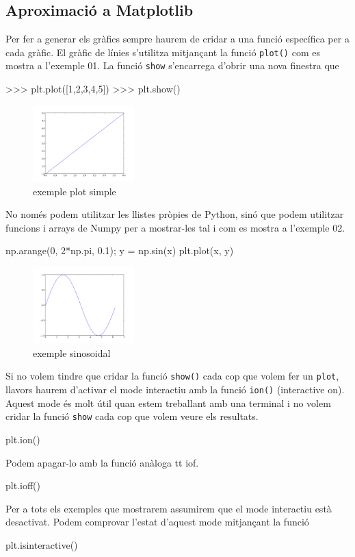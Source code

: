 \subsection{Aproximació a Matplotlib}
Per fer a generar els gràfics sempre haurem de cridar a una funció específica per a cada gràfic. El gràfic de línies s'utilitza mitjançant la funció {\tt plot()} com es mostra a l'exemple 01. La funció {\tt show} s'encarrega d'obrir una nova finestra que 
\begin{tip}[caption=Plot sencill]
>>> plt.plot([1,2,3,4,5])
>>> plt.show()
\end{tip}
\begin{figure}[!h]
    \begin{centering}
    \includegraphics[width=0.35\textwidth]{img/ex01.png}
    \caption{exemple plot simple}
    \label{fig:figex01}
    \end{centering}
\end{figure}
No només podem utilitzar les llistes pròpies de Python, sinó que podem utilitzar funcions i arrays de Numpy per a mostrar-les tal i com es mostra a l'exemple 02.
\begin{tip}[caption=Sinusoidal amb matplotlib]
np.arange(0, 2*np.pi, 0.1);
y = np.sin(x)
plt.plot(x, y)
\end{tip}
\begin{figure}[!h]
    \begin{centering}
    \includegraphics[width=0.35\textwidth]{img/ex02.png}
    \caption{exemple sinosoidal}
    \label{fig:figex02}
    \end{centering}
\end{figure}
Si no volem tindre que cridar la funció {\tt show()} cada cop que volem fer un {\tt plot}, llavors haurem d'activar el mode interactiu amb la funció {\tt ion()} (interactive on). Aquest mode és molt útil quan estem treballant amb una terminal i no volem cridar la funció {\tt show} cada cop que volem veure els resultats.
\begin{blockcode}
plt.ion()
\end{blockcode}
Podem apagar-lo amb la funció anàloga {tt iof}.
\begin{blockcode}
plt.ioff()
\end{blockcode}
Per a tots els exemples que mostrarem assumirem que el mode interactiu està desactivat. Podem comprovar l'estat d'aquest mode mitjançant la funció
\begin{blockcode}
plt.isinteractive()
\end{blockcode}
